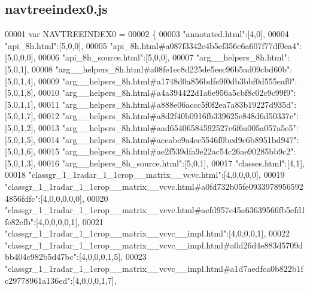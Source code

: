 \subsection{navtreeindex0.\+js}
\label{navtreeindex0_8js_source}

\begin{DoxyCode}
00001 var NAVTREEINDEX0 =
00002 \{
00003 \textcolor{stringliteral}{"annotated.html"}:[4,0],
00004 \textcolor{stringliteral}{"api\_8h.html"}:[5,0,0],
00005 \textcolor{stringliteral}{"api\_8h.html#a087f3342c4b5ef356c6a607f77df0ea4"}:[5,0,0,0],
00006 \textcolor{stringliteral}{"api\_8h\_source.html"}:[5,0,0],
00007 \textcolor{stringliteral}{"arg\_\_helpers\_8h.html"}:[5,0,1],
00008 \textcolor{stringliteral}{"arg\_\_helpers\_8h.html#a08fe1ec8d225de5eec96b5ad09cbd60b"}:[5,0,1,4],
00009 \textcolor{stringliteral}{"arg\_\_helpers\_8h.html#a1748d0a856bdfe9f0db3bbf0d555eaf0"}:[5,0,1,8],
00010 \textcolor{stringliteral}{"arg\_\_helpers\_8h.html#a4a394422d1a6e956a5cbf8c02c9c99f9"}:[5,0,1,1],
00011 \textcolor{stringliteral}{"arg\_\_helpers\_8h.html#a888e06accc5f0f2ea7a83b19227d935d"}:[5,0,1,7],
00012 \textcolor{stringliteral}{"arg\_\_helpers\_8h.html#a8d2f40b0916fb339625e848d6d50337c"}:[5,0,1,2],
00013 \textcolor{stringliteral}{"arg\_\_helpers\_8h.html#aad65406584592527e6f6a005a057a5e5"}:[5,0,1,5],
00014 \textcolor{stringliteral}{"arg\_\_helpers\_8h.html#aceabe9a4ec5546f0bed9c6b8951bd947"}:[5,0,1,6],
00015 \textcolor{stringliteral}{"arg\_\_helpers\_8h.html#ae2f539dfa9e22ac54c26ae90285bb9c2"}:[5,0,1,3],
00016 \textcolor{stringliteral}{"arg\_\_helpers\_8h\_source.html"}:[5,0,1],
00017 \textcolor{stringliteral}{"classes.html"}:[4,1],
00018 \textcolor{stringliteral}{"classgr\_1\_1radar\_1\_1crop\_\_matrix\_\_vcvc.html"}:[4,0,0,0,0],
00019 \textcolor{stringliteral}{"classgr\_1\_1radar\_1\_1crop\_\_matrix\_\_vcvc.html#a0fd732b05fe09339789565924856fdfc"}:[4,0,0,0,0,0],
00020 \textcolor{stringliteral}{"classgr\_1\_1radar\_1\_1crop\_\_matrix\_\_vcvc.html#aefd957c45a63639566fb5efd1fe82efb"}:[4,0,0,0,0,1],
00021 \textcolor{stringliteral}{"classgr\_1\_1radar\_1\_1crop\_\_matrix\_\_vcvc\_\_impl.html"}:[4,0,0,0,1],
00022 \textcolor{stringliteral}{"classgr\_1\_1radar\_1\_1crop\_\_matrix\_\_vcvc\_\_impl.html#a0d26d4e883d5709dbb404c982b5d47bc"}:[4,0,0,0,1,5],
00023 \textcolor{stringliteral}{"classgr\_1\_1radar\_1\_1crop\_\_matrix\_\_vcvc\_\_impl.html#a1d7aedfca0b822b1fc29778961a136ed"}:[4,0,0,0,1,7],

\end{DoxyCode}
